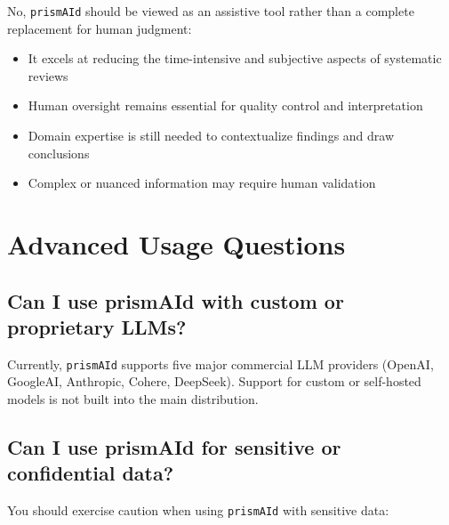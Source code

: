 No, \texttt{prismAId} should be viewed as an assistive tool rather than a complete replacement for human judgment:

\begin{itemize}
    \item It excels at reducing the time-intensive and subjective aspects of systematic reviews
    \item Human oversight remains essential for quality control and interpretation
    \item Domain expertise is still needed to contextualize findings and draw conclusions
    \item Complex or nuanced information may require human validation
\end{itemize}

\section{Advanced Usage Questions}

\subsection{Can I use prismAId with custom or proprietary LLMs?}

Currently, \texttt{prismAId} supports five major commercial LLM providers (OpenAI, GoogleAI, Anthropic, Cohere, DeepSeek). Support for custom or self-hosted models is not built into the main distribution.

\subsection{Can I use prismAId for sensitive or confidential data?}

You should exercise caution when using \texttt{prismAId} with sensitive data:

